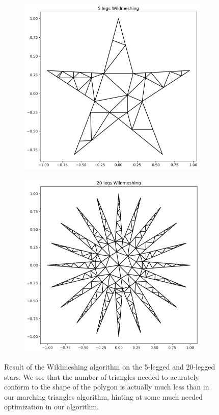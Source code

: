 \documentclass[acmtog]{acmart}
\begin{document}
\begin{figure}[H]
  \centering
  \begin{subfigure}{0.22\textwidth}
    \centering
    \includegraphics[width=\textwidth]{Images/5 legs Wildmeshing.png}
  \end{subfigure}
  \begin{subfigure}{0.22\textwidth}
    \includegraphics[width=\textwidth]{Images/20 legs Wildmeshing.png}
    \centering
  \end{subfigure}\hfill
  \caption{Result of the Wildmeshing algorithm on the 5-legged and 20-legged stars. We see that the number of triangles needed to acurately conform to the shape of the polygon is actually much less than in our marching triangles algorithm, hinting at some much needed optimization in our algorithm.}
\end{figure}
\end{document}
